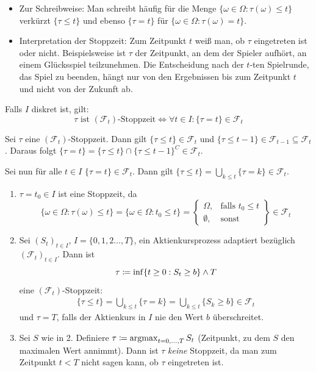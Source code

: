 \documentclass[a4paper,twoside,DIV15,BCOR12mm]{scrbook}
\newcommand{\cF}{\mathcal F}
\begin{document}
\begin{bemerkung}
\begin{itemize}
\item Zur Schreibweise: Man schreibt häufig für die Menge $\{\omega\in\Omega: \tau(\omega)\le t\}$ verkürzt $\{\tau \le t\}$ und ebenso $\{\tau = t\}$ für $\{\omega\in\Omega: \tau(\omega)= t\}$.
\item Interpretation der Stoppzeit: Zum Zeitpunkt $t$ weiß man, ob $\tau$ eingetreten ist oder nicht. Beispielsweise ist $\tau$ der Zeitpunkt, an dem der Spieler aufhört, an einem Glücksspiel teilzunehmen. Die Entscheidung nach der $t$-ten Spielrunde, das Spiel zu beenden, hängt nur von den Ergebnissen bis zum Zeitpunkt $t$ und nicht von der Zukunft ab.
\end{itemize}
\end{bemerkung}

\begin{lemma}
Falls $I$ diskret ist, gilt:
\[
\text{$\tau$ ist $(\cF_t)$-Stoppzeit} \iff \forall t\in I: \{\tau = t\}\in \cF_t
\]
\end{lemma}
\begin{beweis}
Sei $\tau$ eine $(\cF_t)$-Stoppzeit. Dann gilt $\{\tau \le t\} \in \cF_t$ und $\{\tau \le t-1\}\in \cF_{t-1}\subseteq \cF_t$. Daraus folgt $\{\tau=t\}=\{\tau \leq t\} \cap \{\tau \leq t-1\}^C \in \cF_t$.

Sei nun für alle $t\in I$ $\{\tau = t\} \in \cF_t$. Dann gilt $\{\tau \le t\} = \bigcup_{k\le t} \{\tau = k\} \in \cF_t$.
\end{beweis}

\begin{beispiel}
\begin{enumerate}
\label{bsp:2.1.24}\item $\tau = t_0 \in I$ ist eine Stoppzeit, da
\[
\{\omega\in\Omega : \tau (\omega) \le t\}
= \{\omega\in\Omega: t_0\le t\}
= 
\left.
\begin{cases}
\Omega, &\text{falls $t_0\le t$}\\
\emptyset, &\text{sonst}
\end{cases}
\right\}
\in \cF_t
\]
\item Sei $(S_t)_{t\in I}$, $I=\{0, 1, 2\ldots,T\}$, ein Aktienkursprozess  adaptiert bezüglich $(\cF_t)_{t\in I}$. Dann ist
\[
\tau \da \inf \{ t\ge 0: S_t \ge b \} \wedge T
\]
eine $(\cF_t)$-Stoppzeit:
\begin{align*}
\{\tau \le t\} = \bigcup_{k\le t} \{\tau = k\} = \bigcup_{k\le t} \{S_k \ge b\} \in \cF_t
\end{align*}
und $\tau = T$, falls der Aktienkurs in $I$ nie den Wert $b$ überschreitet.
\item  Sei $S$ wie in 2. Definiere $\tau \da \operatorname{argmax}_{t=0,\ldots,T} S_t$ (Zeitpunkt, zu dem $S$ den maximalen Wert annimmt). Dann ist $\tau$ \emph{keine} Stoppzeit, da man zum Zeitpunkt $t<T$ nicht sagen kann, ob $\tau$ eingetreten ist.
\end{enumerate}
\end{beispiel}
\end{document}

